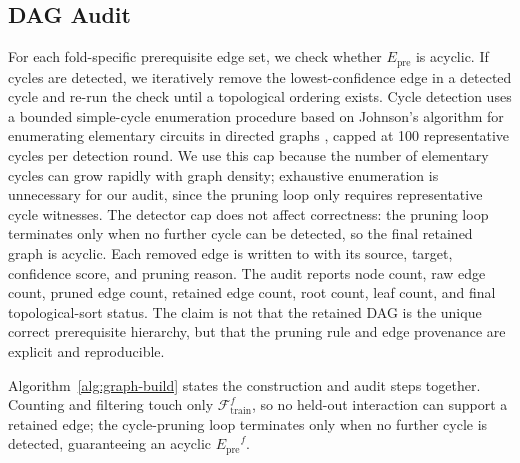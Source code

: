 \documentclass[pdflatex,sn-mathphys-num]{sn-jnl}
\newcommand{\Epre}{\ensuremath{E_{\text{pre}}}}
\begin{document}
\subsection{DAG Audit}
\label{sec:dag-audit}
For each fold-specific prerequisite edge set, we check whether $\Epre$
is acyclic. If cycles are detected, we iteratively remove the
lowest-confidence edge in a detected cycle and re-run the check until a
topological ordering exists. Cycle detection uses a bounded simple-cycle enumeration procedure based on
Johnson's algorithm for enumerating elementary circuits in directed graphs \cite{johnson1975finding}, capped at 100 representative cycles per detection round. We use this cap because the number of elementary cycles can grow rapidly with graph density; exhaustive enumeration is unnecessary for our
audit, since the pruning loop only requires representative cycle witnesses. The detector cap does not affect
correctness: the pruning loop terminates only when no further cycle can
be detected, so the final retained graph is acyclic. Each removed edge
is written to
 with its source,
target, confidence score, and pruning reason. The audit reports node
count, raw edge count, pruned edge count, retained edge count, root
count, leaf count, and final topological-sort status. The claim is not
that the retained DAG is the unique correct prerequisite hierarchy, but
that the pruning rule and edge provenance are explicit and reproducible.

Algorithm~\ref{alg:graph-build} states the construction and audit steps
together. Counting and filtering touch only $\mathcal{F}^f_{\text{train}}$,
so no held-out interaction can support a retained edge; the cycle-pruning loop
terminates only when no further cycle is detected, guaranteeing an acyclic
$\Epre^f$.
\end{document}
